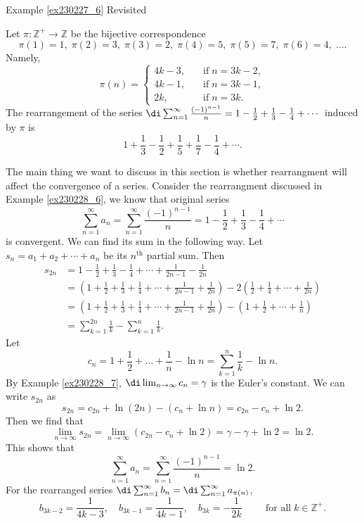 \begin{example}{\linkt Example \ref{ex230227_6} Revisited}
\begin{example}[label=ex230227_13]{}
\begin{example}[label=ex230228_6]{}
Let $\pi:\mathbb{Z}^+\to\mathbb{Z}$ be the bijective correspondence
\[\pi(1)=1,\;\pi(2)=3, \;\pi(3)=2,\;\pi(4)=5,\;\pi(5)=7,\;\pi(6)=4, \;\ldots.\]Namely,
\[\pi(n)=\begin{cases}4k-3,\quad &\text{if}\;n=3k-2,\\
4k-1,\quad &\text{if}\;n=3k-1,\\
2k,\quad &\text{if}\;n=3k.
\end{cases}\]
The rearrangement of the series $\di\sum_{n=1}^{\infty}\frac{(-1)^{n-1}}{n}=1-\frac{1}{2}+\frac{1}{3}-\frac{1}{4}+\cdots$
induced by $\pi$ is
\[1+\frac{1}{3}-\frac{1}{2}+\frac{1}{5}+\frac{1}{7}-\frac{1}{4}+\cdots.\]
\end{example}
The main thing we want to discuss in this section is whether rearrangment will affect the convergence of a series. Consider the rearrangment discussed in Example \ref{ex230228_6}, we know that original series\[\sum_{n=1}^{\infty}a_n=\sum_{n=1}^{\infty}\frac{(-1)^{n-1}}{n}=1-\frac{1}{2}+\frac{1}{3}-\frac{1}{4}+\cdots\] is convergent. 
We can find its sum in the following way. Let $s_n=a_1+a_2+\cdots+a_n$ be its $n^{\text{th}}$ partial sum. 
Then
\begin{align*}
s_{2n}&=1-\frac{1}{2}+\frac{1}{3}-\frac{1}{4}+\cdots+\frac{1}{2n-1}-\frac{1}{2n}
\\&=\left(1+\frac{1}{2}+\frac{1}{3}+\frac{1}{4}+\cdots+\frac{1}{2n-1}+\frac{1}{2n}\right)-2 \left( \frac{1}{2}+\frac{1}{4}+\cdots+\frac{1}{2n}\right)
\\&=\left(1+\frac{1}{2}+\frac{1}{3}+\frac{1}{4}+\cdots+\frac{1}{2n-1}+\frac{1}{2n}\right)-  \left( 1+\frac{1}{2}+\cdots+\frac{1}{n}\right)\\
&=\sum_{k=1}^{2n}\frac{1}{k}-\sum_{k=1}^{n}\frac{1}{k}.
\end{align*}Let
\[c_n=1+\frac{1}{2}+\ldots+\frac{1}{n}-\ln n=\sum_{k=1}^{n}\frac{1}{k}-\ln n.\]
By Example \ref{ex230228_7}, $\di\lim_{n\to\infty}c_n=\gamma$ is the Euler's constant.
We can write $s_{2n}$ as 
\[s_{2n}=c_{2n}+\ln(2n)-\left(c_n+\ln n\right)=c_{2n}-c_n+\ln 2.\]
Then we find that
\[\lim_{n\to\infty} s_{2n}=\lim_{n\to\infty}(c_{2n}-c_n+\ln 2)=\gamma-\gamma+\ln 2=\ln 2.\]
This shows that  \[\sum_{n=1}^{\infty}a_n=\sum_{n=1}^{\infty}\frac{(-1)^{n-1}}{n}=\ln 2.\]
For the rearranged series $\di\sum_{n=1}^{\infty}b_n=\di\sum_{n=1}^{\infty}a_{\pi(n)}$,
\[b_{3k-2}=\frac{1}{4k-3},\quad b_{3k-1}=\frac{1}{4k-1},\quad b_{3k}=-\frac{1}{2k}\hspace{1cm}\text{for all}\;k\in\mathbb{Z}^+.\]

\end{example}
\end{example}
